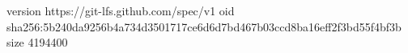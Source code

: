 version https://git-lfs.github.com/spec/v1
oid sha256:5b240da9256b4a734d3501717ce6d6d7bd467b03ccd8ba16eff2f3bd55f4bf3b
size 4194400
